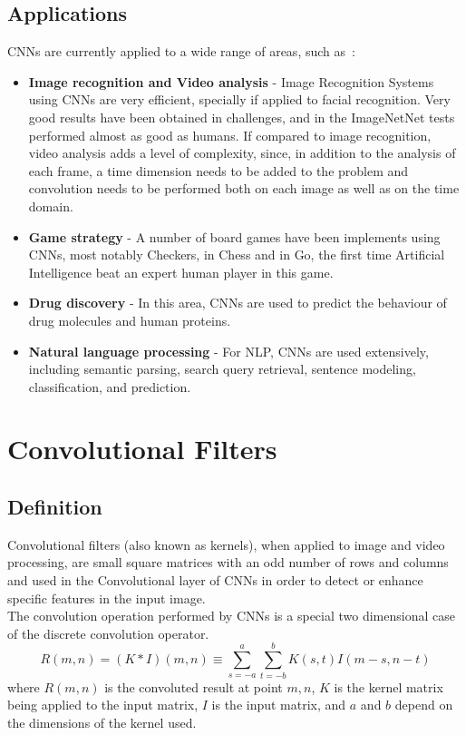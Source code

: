 \subsection{Applications}
\label{sec:convolution:convolutionalneuralnetworks:applications}
CNNs are currently applied to a wide range of areas, such as~\citep{Schmidhuber2015}:
\begin{itemize}
    \item \textbf{Image recognition and Video analysis} - Image Recognition Systems using CNNs are very efficient, specially if applied to facial recognition. Very good results have been obtained in challenges, and in the ImageNetNet tests performed almost as good as humans. If compared to image recognition, video analysis adds a level of complexity, since, in addition to the analysis of each frame, a time dimension needs to be added to the problem and convolution needs to be performed both on each image as well as on the time domain.
    \item \textbf{Game strategy} - A number of board games have been implements using CNNs, most notably Checkers, in Chess and in Go, the first time Artificial Intelligence beat an expert human player in this game.
    \item \textbf{Drug discovery} - In this area, CNNs are used to predict the behaviour of drug molecules and human proteins.
    \item \textbf{Natural language processing} - For NLP, CNNs are used extensively, including semantic parsing, search query retrieval, sentence modeling, classification, and prediction.
\end{itemize}
\section{Convolutional Filters}
\label{sec:convolution:convolutionalfilters}
\subsection{Definition}
\label{sec:convolution:convolutionalfilters:definition}
Convolutional filters (also known as kernels), when applied to image and video processing, are small square matrices with an odd number of rows and columns and used in the Convolutional layer of CNNs in order to detect or enhance specific features in the input image.\\
The convolution operation performed by CNNs is a special two dimensional case of the discrete convolution operator.
\begin{equation}
R(m,n) = (K * I)(m,n)\equiv\sum_{s=-a}^{a}\sum_{t=-b}^{b}K(s,t)I(m-s,n-t)
\end{equation}
where $R(m,n)$ is the convoluted result at point $m,n$, $K$ is the kernel matrix being applied to the input matrix, $I$ is the input matrix, and $a$ and $b$ depend on the dimensions of the kernel used.
